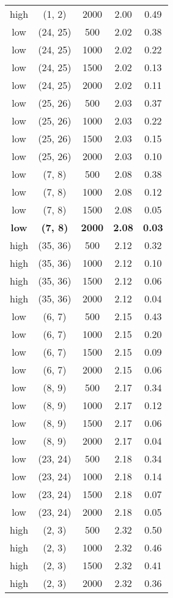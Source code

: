 \begin{tabular}{c c c c c}
high & (1, 2) &  2000 & 2.00 & 0.49 \\
low & (24, 25) &  500 & 2.02 & 0.38 \\
low & (24, 25) &  1000 & 2.02 & 0.22 \\
low & (24, 25) &  1500 & 2.02 & 0.13 \\
low & (24, 25) &  2000 & 2.02 & 0.11 \\
low & (25, 26) &  500 & 2.03 & 0.37 \\
low & (25, 26) &  1000 & 2.03 & 0.22 \\
low & (25, 26) &  1500 & 2.03 & 0.15 \\
low & (25, 26) &  2000 & 2.03 & 0.10 \\
low & (7, 8) &  500 & 2.08 & 0.38 \\
low & (7, 8) &  1000 & 2.08 & 0.12 \\
low & (7, 8) &  1500 & 2.08 & 0.05 \\
\textbf{low} & \textbf{(7, 8)} & \textbf{ 2000} & \textbf{2.08} & \textbf{0.03} \\
high & (35, 36) &  500 & 2.12 & 0.32 \\
high & (35, 36) &  1000 & 2.12 & 0.10 \\
high & (35, 36) &  1500 & 2.12 & 0.06 \\
high & (35, 36) &  2000 & 2.12 & 0.04 \\
low & (6, 7) &  500 & 2.15 & 0.43 \\
low & (6, 7) &  1000 & 2.15 & 0.20 \\
low & (6, 7) &  1500 & 2.15 & 0.09 \\
low & (6, 7) &  2000 & 2.15 & 0.06 \\
low & (8, 9) &  500 & 2.17 & 0.34 \\
low & (8, 9) &  1000 & 2.17 & 0.12 \\
low & (8, 9) &  1500 & 2.17 & 0.06 \\
low & (8, 9) &  2000 & 2.17 & 0.04 \\
low & (23, 24) &  500 & 2.18 & 0.34 \\
low & (23, 24) &  1000 & 2.18 & 0.14 \\
low & (23, 24) &  1500 & 2.18 & 0.07 \\
low & (23, 24) &  2000 & 2.18 & 0.05 \\
high & (2, 3) &  500 & 2.32 & 0.50 \\
high & (2, 3) &  1000 & 2.32 & 0.46 \\
high & (2, 3) &  1500 & 2.32 & 0.41 \\
high & (2, 3) &  2000 & 2.32 & 0.36 \\

\end{tabular}
